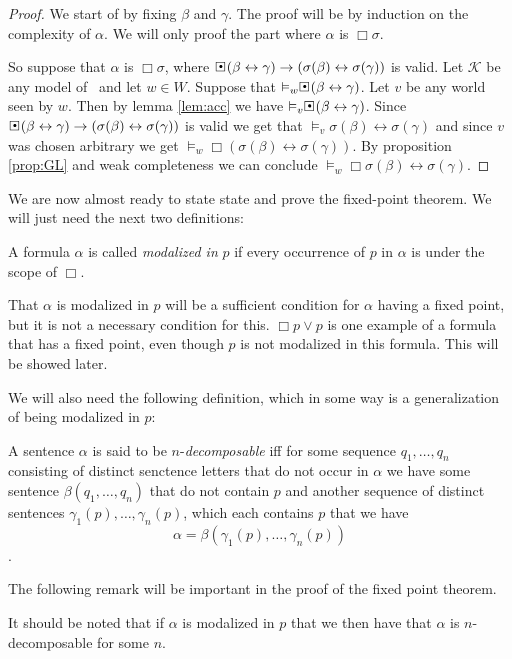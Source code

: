 \documentclass[../main.tex]{subfiles}
\begin{document}
\begin{proof}
	We start of by fixing $\beta$ and $\gamma$. The proof will be by
	induction on the complexity of $\alpha$. We will only proof the part
	where $\alpha$ is $\Box\sigma$.

	So suppose that $\alpha$ is $\Box\sigma$, where
	$\sBox(\beta\leftrightarrow\gamma)\rightarrow(\sigma(\beta)\leftrightarrow\sigma(\gamma))$
	is valid. Let $\mathcal{K}$ be any model of \GL\ and let $w\in W$.
	Suppose that $\vDash_w\sBox(\beta\leftrightarrow\gamma)$. Let $v$ be
	any world seen by $w$. Then by lemma \ref{lem:acc} we have
	$\vDash_v\sBox(\beta\leftrightarrow\gamma)$. Since 
	$\sBox(\beta\leftrightarrow\gamma)\rightarrow(\sigma(\beta)\leftrightarrow\sigma(\gamma))$
	is valid we get that
	$\vDash_v\sigma(\beta)\leftrightarrow\sigma(\gamma)$ and since
	$v$ was chosen arbitrary we get
	$\vDash_w\Box(\sigma(\beta)\leftrightarrow\sigma(\gamma))$. By
	proposition \ref{prop:GL} and weak completeness we can conclude
	$\vDash_w\Box\sigma(\beta)\leftrightarrow\sigma(\gamma)$.
\end{proof}

We are now almost ready to state state and prove the fixed-point theorem. We
will just need the next two definitions:
\begin{defi}
	A formula $\alpha$ is called \textit{modalized in} $p$ if every occurrence of
	$p$ in  $\alpha$ is under the scope of $\Box$.
\end{defi}
That  $\alpha$ is modalized in $p$ will be a sufficient  condition for $\alpha$
having a fixed point, but it is not a necessary condition for this. $\Box p\vee
p$ is one example of a formula that has a fixed point, even though $p$ is not
modalized in this formula.  This will be showed later.

We will also need the following definition, which in some way is a
generalization of being modalized in $p$:
\begin{defi}
	A sentence $\alpha$ is said to be $n$-\textit{decomposable} iff for some
	sequence $q_1,\ldots,q_n$ consisting of distinct senctence letters that
	do not occur in $\alpha$ we have some sentence $\beta(q_1,\ldots,q_n)$
	that do not contain $p$ and another sequence of distinct sentences 
	$\gamma_1(p),\ldots,\gamma_n(p)$, which each contains $p$ that we have
	$$\alpha=\beta(\gamma_1(p),\ldots,\gamma_n(p))$$.
\end{defi}
The following remark will be important in the proof of the fixed point theorem.
\begin{remark}
It should be noted that if $\alpha$ is modalized in $p$ that we then have that
$\alpha$ is $n$-decomposable for some $n$.
\end{remark}
\end{document}
